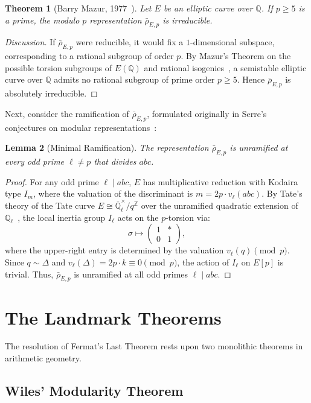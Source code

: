 \documentclass[11pt,a4paper]{article}
\theoremstyle{plain}
\newtheorem{theorem}{Theorem}[section]
\newtheorem{lemma}[theorem]{Lemma}
\theoremstyle{definition}
\theoremstyle{remark}
\newcommand{\Q}{\mathbb{Q}}
\newcommand{\Z}{\mathbb{Z}}
\begin{document}
\begin{theorem}[Barry Mazur, 1977~\cite{mazur1977}]
\label{thm:mazur}
Let $E$ be an elliptic curve over $\Q$. If $p \ge 5$ is a prime, the modulo $p$ representation $\bar{\rho}_{E,p}$ is irreducible.
\end{theorem}
\begin{proof}[Discussion]
If $\bar{\rho}_{E,p}$ were reducible, it would fix a $1$-dimensional subspace, corresponding to a rational subgroup of order $p$. By Mazur's Theorem on the possible torsion subgroups of $E(\Q)$ and rational isogenies~\cite{mazur1977}, a semistable elliptic curve over $\Q$ admits no rational subgroup of prime order $p \ge 5$. Hence $\bar{\rho}_{E,p}$ is absolutely irreducible.
\end{proof}

Next, consider the ramification of $\bar{\rho}_{E,p}$, formulated originally in Serre's conjectures on modular representations~\cite{serre1987}:
\begin{lemma}[Minimal Ramification]
\label{lem:unramified}
The representation $\bar{\rho}_{E,p}$ is unramified at every odd prime $\ell \neq p$ that divides $abc$.
\end{lemma}
\begin{proof}
For any odd prime $\ell \mid abc$, $E$ has multiplicative reduction with Kodaira type $I_m$, where the valuation of the discriminant is $m = 2p \cdot v_\ell(abc)$. By Tate's theory of the Tate curve $E \cong \overline{\Q}_\ell^\times / q^\Z$ over the unramified quadratic extension of $\Q_\ell$~\cite{silverman2009}, the local inertia group $I_\ell$ acts on the $p$-torsion via:
\[
\sigma \mapsto \begin{pmatrix} 1 & * \\ 0 & 1 \end{pmatrix},
\]
where the upper-right entry is determined by the valuation $v_\ell(q) \pmod p$. Since $q \sim \Delta$ and $v_\ell(\Delta) = 2p \cdot k \equiv 0 \pmod p$, the action of $I_\ell$ on $E[p]$ is trivial. Thus, $\bar{\rho}_{E,p}$ is unramified at all odd primes $\ell \mid abc$.
\end{proof}

\section{The Landmark Theorems}

The resolution of Fermat's Last Theorem rests upon two monolithic theorems in arithmetic geometry.

\subsection{Wiles' Modularity Theorem}
\end{document}
